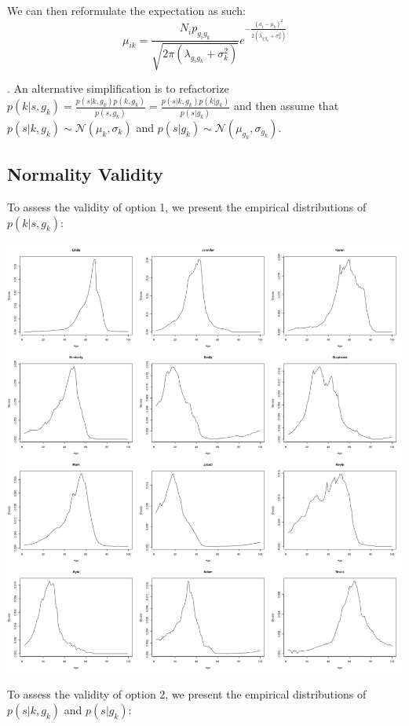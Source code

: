 \documentclass[12pt]{article}
\begin{document}
\noindent We can then reformulate the expectation as such:
$$\mu_{ik} =
\frac{N_i p_{g_ig_k}}{\sqrt{2\pi(\lambda_{g_ig_k} + \sigma_{k}^2)}} e^{-\frac{(a_i-\mu_{k})^2}{2(\lambda_{g_ig_k}+\sigma_{k}^2)}} 
$$

. An alternative simplification is to refactorize $p(k | s, g_k) = \frac{p(s | k, g_k) p(k, g_k)}{p(s, g_k)} = \frac{p(s | k, g_k) p(k | g_k)}{p(s | g_k)}$ and then assume that $p(s | k, g_k) \sim \mathcal{N}(\mu_{k}, \sigma_{k})$ and $p(s | g_k) \sim \mathcal{N}(\mu_{g_k}, \sigma_{g_k})$.

\pagebreak
\subsection*{Normality Validity}
\noindent To assess the validity of option 1, we present the empirical distributions of $p(k | s, g_k)$:

\begin{center}
\includegraphics[scale = 0.4]{Option1_Histograms.png}
\end{center}

\pagebreak
\noindent To assess the validity of option 2, we present the empirical distributions of $p(s | k, g_k)$ and $p(s | g_k)$:
\end{document}
